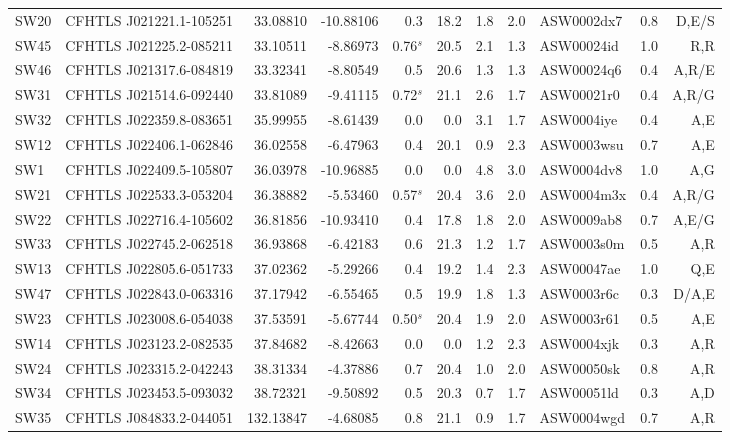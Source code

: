 \documentclass[useAMS,usenatbib,a4paper]{mn2e}
\begin{document}
\begin{center}
\begin{longtable}{llrrrrrrlrr}
SW20 & CFHTLS J021221.1-105251 &  33.08810 & -10.88106 &  0.3 & 18.2 &  1.8 &  2.0 & ASW0002dx7 &  0.8 &  D,E/S   \\ 
SW45 & CFHTLS J021225.2-085211 &  33.10511 &  -8.86973 &  0.76$^s$ & 20.5 &  2.1 &  1.3 & ASW00024id &  1.0 &  R,R   \\ 
SW46 & CFHTLS J021317.6-084819 &  33.32341 &  -8.80549 &  0.5 & 20.6 &  1.3 &  1.3 & ASW00024q6 &  0.4 &  A,R/E   \\ 
SW31 & CFHTLS J021514.6-092440 &  33.81089 &  -9.41115 &  0.72$^s$ & 21.1 &  2.6 &  1.7 & ASW00021r0 &  0.4 &  A,R/G   \\ 
SW32 & CFHTLS J022359.8-083651 &  35.99955 &  -8.61439 &  0.0 &  0.0 &  3.1 &  1.7 & ASW0004iye &  0.4 &  A,E   \\ 
SW12 & CFHTLS J022406.1-062846 &  36.02558 &  -6.47963 &  0.4 & 20.1 &  0.9 &  2.3 & ASW0003wsu &  0.7 &  A,E   \\ 
SW1 & CFHTLS J022409.5-105807 &  36.03978 & -10.96885 &  0.0 &  0.0 &  4.8 &  3.0 & ASW0004dv8 &  1.0 &  A,G   \\ 
SW21 & CFHTLS J022533.3-053204 &  36.38882 &  -5.53460 &  0.57$^s$ & 20.4 &  3.6 &  2.0 & ASW0004m3x &  0.4 &  A,R/G   \\ 
SW22 & CFHTLS J022716.4-105602 &  36.81856 & -10.93410 &  0.4 & 17.8 &  1.8 &  2.0 & ASW0009ab8 &  0.7 &  A,E/G   \\ 
SW33 & CFHTLS J022745.2-062518 &  36.93868 &  -6.42183 &  0.6 & 21.3 &  1.2 &  1.7 & ASW0003s0m &  0.5 &  A,R   \\ 
SW13 & CFHTLS J022805.6-051733 &  37.02362 &  -5.29266 &  0.4 & 19.2 &  1.4 &  2.3 & ASW00047ae &  1.0 &  Q,E   \\ 
SW47 & CFHTLS J022843.0-063316 &  37.17942 &  -6.55465 &  0.5 & 19.9 &  1.8 &  1.3 & ASW0003r6c &  0.3 &  D/A,E   \\ 
SW23 & CFHTLS J023008.6-054038 &  37.53591 &  -5.67744 &  0.50$^s$ & 20.4 &  1.9 &  2.0 & ASW0003r61 &  0.5 &  A,E   \\ 
SW14 & CFHTLS J023123.2-082535 &  37.84682 &  -8.42663 &  0.0 & 0.0 &  1.2 &  2.3 & ASW0004xjk &  0.3 &  A,R   \\ 
SW24 & CFHTLS J023315.2-042243 &  38.31334 &  -4.37886 &  0.7 & 20.4 &  1.0 &  2.0 & ASW00050sk &  0.8 &  A,R   \\ 
SW34 & CFHTLS J023453.5-093032 &  38.72321 &  -9.50892 &  0.5 & 20.3 &  0.7 &  1.7 & ASW00051ld &  0.3 &  A,D   \\ 
SW35 & CFHTLS J084833.2-044051 & 132.13847 &  -4.68085 &  0.8 & 21.1 &  0.9 &  1.7 & ASW0004wgd &  0.7 &  A,R   \\ 

\end{longtable}
\end{center}
\end{document}
